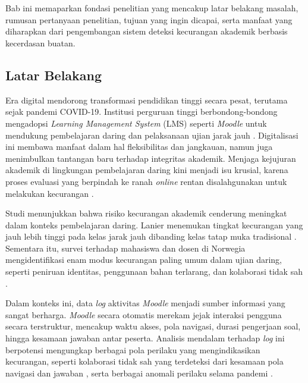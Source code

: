 \chapter{\babSatu}
\label{bab:1}
Bab ini memaparkan fondasi penelitian yang mencakup latar belakang masalah, rumusan pertanyaan penelitian, tujuan yang ingin dicapai, serta manfaat yang diharapkan dari pengembangan sistem deteksi kecurangan akademik berbasis kecerdasan buatan. 

\section{Latar Belakang}
\label{sec:latarBelakang}

Era digital mendorong transformasi pendidikan tinggi secara pesat, terutama sejak pandemi COVID-19. Institusi perguruan tinggi berbondong-bondong mengadopsi \textit{Learning Management System} (LMS) seperti \textit{Moodle} untuk mendukung pembelajaran daring dan pelaksanaan ujian jarak jauh \cite{Yulita2023}. Digitalisasi ini membawa manfaat dalam hal fleksibilitas dan jangkauan, namun juga menimbulkan tantangan baru terhadap integritas akademik. Menjaga kejujuran akademik di lingkungan pembelajaran daring kini menjadi isu krusial, karena proses evaluasi yang berpindah ke ranah \textit{online} rentan disalahgunakan untuk melakukan kecurangan \cite{Kamalov2021}.

Studi menunjukkan bahwa risiko kecurangan akademik cenderung meningkat dalam konteks pembelajaran daring. Lanier menemukan tingkat kecurangan yang jauh lebih tinggi pada kelas jarak jauh dibanding kelas tatap muka tradisional \cite{Lanier2006}. Sementara itu, survei terhadap mahasiswa dan dosen di Norwegia mengidentifikasi enam modus kecurangan paling umum dalam ujian daring, seperti peniruan identitas, penggunaan bahan terlarang, dan kolaborasi tidak sah \cite{Chirumamilla2020}.

Dalam konteks ini, data \textit{log} aktivitas \textit{Moodle} menjadi sumber informasi yang sangat berharga. \textit{Moodle} secara otomatis merekam jejak interaksi pengguna secara terstruktur, mencakup waktu akses, pola navigasi, durasi pengerjaan soal, hingga kesamaan jawaban antar peserta. Analisis mendalam terhadap \textit{log} ini berpotensi mengungkap berbagai pola perilaku yang mengindikasikan kecurangan, seperti kolaborasi tidak sah yang terdeteksi dari kesamaan pola navigasi dan jawaban \cite{Murdoch2019}, serta berbagai anomali perilaku selama pandemi \cite{Balderas2020}.

